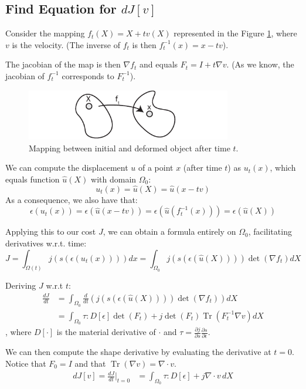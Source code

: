 \documentclass[11pt]{article}
\DeclareMathOperator{\Tr}{Tr}
\begin{document}
\subsection{Find Equation for $dJ[v]$}
Consider the mapping $f_t(X) = X + t v(X)$ represented in the Figure \ref{fig:mapping}, where $v$ is the velocity. (The inverse of $f_t$ is then $f_t^{-1}(x) = x - tv$). 

The jacobian of the map is then $\nabla f_t$ and equals $F_t = I + t\nabla v$. (As we know, the jacobian of $f_t^{-1}$ corresponds to $F_t^{-1}$).

  \begin{figure}[hbt]
    \begin{center}
      \includegraphics[width=0.8\textwidth]{figures/mapping}
    \end{center}
    \caption{Mapping between initial and deformed object after time $t$.}
    \label{fig:mapping}
  \end{figure}

We can compute the displacement $u$ of a point $x$ (after time $t$) as $u_t(x)$, which equals function $\hat u(X)$ with domain $\Omega_0$: 
$$
  u_t(x) = \hat u(X) = \hat u(x - tv)
$$
As a consequence, we also have that:
$$
  \epsilon(u_t(x)) = \epsilon(\hat u (x - tv)) = \epsilon(\hat u (f_t^{-1}(x))) = \epsilon(\hat u(X))
$$

Applying this to our cost $J$, we can obtain a formula entirely on $\Omega_0$, facilitating derivatives w.r.t. time:
$$
J = \int_{\Omega(t)} j(s(\epsilon(u_t(x)))) dx = \int_{\Omega_0} j(s(\epsilon(\hat u (X) ) ) ) \det(\nabla f_t) dX
$$

Deriving $J$ w.r.t $t$:
\begin{align*}
  \frac{dJ}{dt} &= \int_{\Omega_0} \frac{d}{dt} \left( j(s(\epsilon(\hat u (X) ) ) ) \det(\nabla f_t) \right) dX\\
  &= \int_{\Omega_0} \tau : D[\epsilon] \det(F_t) + j \det(F_t) \Tr(F_t^{-1} \nabla v) dX
\end{align*}
, where $D[\cdot]$ is the material derivative of $\cdot$ and $\tau = \frac{\partial j}{\partial s} \frac{\partial s}{\partial \epsilon}$.

We can then compute the shape derivative by evaluating the derivative at $t=0$. Notice that $F_0 = I$ and that $\Tr(\nabla v) = \nabla \cdot v$.
\begin{align*}
  dJ[v] = \frac{dJ}{dt} \Big|_{t=0} &= \int_{\Omega_0} \tau : D[\epsilon] + j \nabla \cdot v \, dX
\end{align*}
\end{document}
